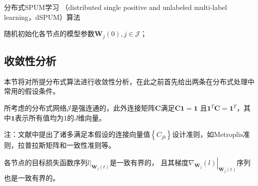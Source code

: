\begin{algorithm}[htbp]
	\caption{分布式SPUM学习
    （distributed single positive and unlabeled multi-label learning，dSPUM）算法}
	\label{dSSML_eventTrigger_ori}
	\LinesNumbered
	{随机初始化各节点的模型参数$\boldsymbol{W}_j\left(0\right), j \in \mathcal{J}$}；\\
\end{algorithm}

\subsection{收敛性分析}\label{Char3_Conv}
本节将对所提分布式算法进行收敛性分析，在此之前首先给出两条在分布式处理中常用的假设条件。
\begin{assumption} 
    所考虑的分布式网络$\mathcal{J}$是强连通的，此外连接矩阵$\boldsymbol C$满足$\boldsymbol C \boldsymbol1=\boldsymbol1$
    且$\boldsymbol1^T\boldsymbol C=\boldsymbol1^T$，其中$\boldsymbol1$表示所有值均为$\mathrm{1}$的$J$维向量。
    
    注：文献中提出了诸多满足本假设的连接向量值$\left\{C_{jb}\right\}$设计准则，如$\mathrm{Metroplis}$准则\rm{\cite{Fang_Metropolis_2010}}，拉普拉斯矩阵\rm{\cite{Olfati_Laplas_2004}}和一致性准则\rm{\cite{Kang_Uniform_2021}}等。
\end{assumption}
\begin{assumption}
    各节点的目标损失函数序列$\left.l\right|_{\boldsymbol{W}_j\left(t\right)}$是一致有界的，
    且其梯度$\left.\nabla_{\boldsymbol{W}_j} \left(l\right)\right|_{\boldsymbol{W}_j\left(t\right)}$序列也是一致有界的。
\end{assumption}


